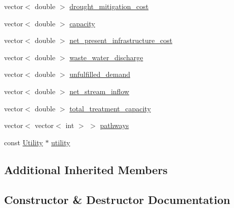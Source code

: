 \begin{DoxyCompactItemize}
vector$<$ double $>$ \mbox{\hyperlink{classUtilitiesDataCollector_a8c6cbd05a930533e32f1ee374380d24b_a8c6cbd05a930533e32f1ee374380d24b}{drought\+\_\+mitigation\+\_\+cost}}
\item 
vector$<$ double $>$ \mbox{\hyperlink{classUtilitiesDataCollector_ad288dee20ff2e20caaa1e6a67ad815ae_ad288dee20ff2e20caaa1e6a67ad815ae}{capacity}}
\item 
vector$<$ double $>$ \mbox{\hyperlink{classUtilitiesDataCollector_ac86eb33899a451037dd27f3330378df2_ac86eb33899a451037dd27f3330378df2}{net\+\_\+present\+\_\+infrastructure\+\_\+cost}}
\item 
vector$<$ double $>$ \mbox{\hyperlink{classUtilitiesDataCollector_ad329c0652d880f257f1ee73fbf2ee632_ad329c0652d880f257f1ee73fbf2ee632}{waste\+\_\+water\+\_\+discharge}}
\item 
vector$<$ double $>$ \mbox{\hyperlink{classUtilitiesDataCollector_a8af280724d0a10ea6fafbc426c04266a_a8af280724d0a10ea6fafbc426c04266a}{unfulfilled\+\_\+demand}}
\item 
vector$<$ double $>$ \mbox{\hyperlink{classUtilitiesDataCollector_ab42e458d9475733cd2fa89353b7567f2_ab42e458d9475733cd2fa89353b7567f2}{net\+\_\+stream\+\_\+inflow}}
\item 
vector$<$ double $>$ \mbox{\hyperlink{classUtilitiesDataCollector_a0b3587a8ce9176a8e73152c957ba9322_a0b3587a8ce9176a8e73152c957ba9322}{total\+\_\+treatment\+\_\+capacity}}
\item 
vector$<$ vector$<$ int $>$ $>$ \mbox{\hyperlink{classUtilitiesDataCollector_a8f3c2305f751b65af66b202a6050eab2_a8f3c2305f751b65af66b202a6050eab2}{pathways}}
\item 
const \mbox{\hyperlink{classUtility}{Utility}} $\ast$ \mbox{\hyperlink{classUtilitiesDataCollector_a215beae386004a66b72e40c3f07a7455_a215beae386004a66b72e40c3f07a7455}{utility}}
\end{DoxyCompactItemize}
\subsection*{Additional Inherited Members}


\subsection{Constructor \& Destructor Documentation}
\mbox{\label{classUtilitiesDataCollector_a7aee55a1cbd0fcdca59339a9e78ed08b_a7aee55a1cbd0fcdca59339a9e78ed08b}} 
